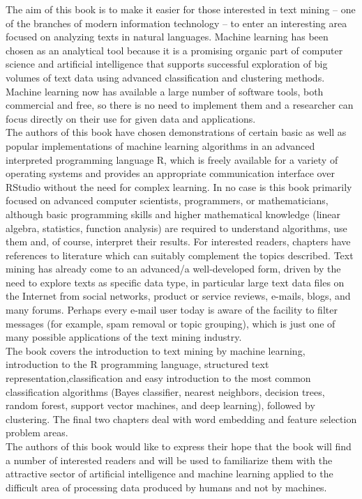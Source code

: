 \documentclass[twoside,11pt]{book}
\begin{document}
{\setlength{\parindent}{0pt}
\noindent
The aim of this book is to make it easier for those interested in text mining –
one of the branches of modern information technology – to enter an interesting
area focused on analyzing texts in natural languages. Machine learning has been
chosen as an analytical tool because it is a promising organic part of computer
science and artificial intelligence that supports successful exploration of big
volumes of text data using advanced classification and clustering methods.
Machine learning now has available a large number of software tools, both
commercial and free, so there is no need to implement them and a researcher can
focus directly on their use for given data and applications. \\

\hspace*{0.5cm}The authors of this book have chosen demonstrations of certain basic as
well as popular implementations of machine learning algorithms in an advanced
interpreted programming language R, which is freely available for a variety of
operating systems and provides an appropriate communication interface over
RStudio without the need for complex learning. In no case is this book primarily
focused on advanced computer scientists, programmers, or mathematicians,
although basic programming skills and higher mathematical knowledge (linear
algebra, statistics, function analysis) are required to understand algorithms, use
them and, of course, interpret their results. For interested readers, chapters have
references to literature which can suitably complement the topics described. Text
mining has already come to an advanced/a well-developed form, driven by the
need to explore texts as specific data type, in particular large text data files on
the Internet from social networks, product or service reviews, e-mails, blogs, and
many forums. Perhaps every e-mail user today is aware of the facility to filter
messages (for example, spam removal or topic grouping), which is just one of
many possible applications of the text mining industry.\\

\hspace*{0.5cm} The book covers the introduction to text mining by machine learning,
introduction to the R programming language, structured text representation,classification and easy introduction to the most common classification algorithms
(Bayes classifier, nearest neighbors, decision trees, random forest, support vector
machines, and deep learning), followed by clustering. The final two chapters deal
with word embedding and feature selection problem areas.\\

\hspace*{0.5cm} The authors of this book would like to express their hope that the book will
find a number of interested readers and will be used to familiarize them with
the attractive sector of artificial intelligence and machine learning applied to the
difficult area of processing data produced by humans and not by machines.\\
}
\end{document}
